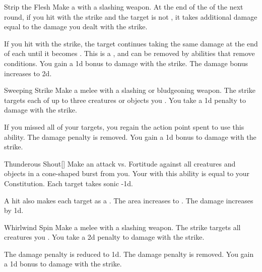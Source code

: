 {            \begin{ability}{Strip the Flesh}
                Make a  with a slashing weapon.
                At the end of the  of the next round, if you hit with the strike and the target is not , it takes additional damage equal to the damage you dealt with the strike.

                \rankline
                 If you hit with the strike, the target continues taking the same damage at the end of each  until it becomes .
                This is a , and can be removed by abilities that remove conditions.
                 You gain a \plus1d bonus to damage with the strike.
                 The damage bonus increases to \plus2d.
            \end{ability}

            \begin{ability}{Sweeping Strike}
                Make a melee  with a slashing or bludgeoning weapon.
                The strike targets each of up to three creatures or objects you .
                You take a \minus1d penalty to damage with the strike.

                \rankline
                 If you missed all of your targets, you regain the action point spent to use this ability.
                 The damage penalty is removed.
                 You gain a \plus1d bonus to damage with the strike.
            \end{ability}

            \begin{ability}{Thunderous Shout}[]
                Make an attack vs. Fortitude against all creatures and objects in a \areamed cone-shaped burst from you.
                Your  with this ability is equal to your Constitution.
                \hit Each target takes sonic  -1d.

                \rankline
                 A hit also makes each target  as a .
                 The area increases to \arealarge.
                 The damage increases by \plus1d.
            \end{ability}

            \begin{ability}{Whirlwind Spin}
                Make a melee  with a slashing weapon.
                The strike targets all creatures you .
                You take a \minus2d penalty to damage with the strike.

                \rankline
                 The damage penalty is reduced to \minus1d.
                 The damage penalty is removed.
                 You gain a \plus1d bonus to damage with the strike.
            \end{ability}
        }

